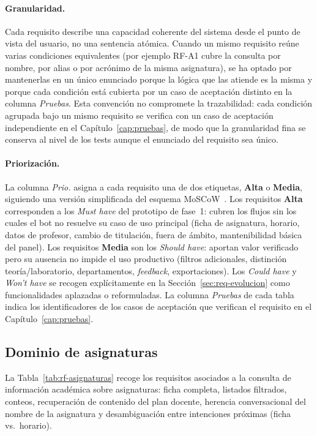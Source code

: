 \paragraph{Granularidad.} Cada requisito describe una capacidad coherente del sistema desde el punto de vista del usuario, no una sentencia atómica. Cuando un mismo requisito reúne varias condiciones equivalentes (por ejemplo RF-A1 cubre la consulta por nombre, por alias o por acrónimo de la misma asignatura), se ha optado por mantenerlas en un único enunciado porque la lógica que las atiende es la misma y porque cada condición está cubierta por un caso de aceptación distinto en la columna \textit{Pruebas}. Esta convención no compromete la trazabilidad: cada condición agrupada bajo un mismo requisito se verifica con un caso de aceptación independiente en el Capítulo~\ref{cap:pruebas}, de modo que la granularidad fina se conserva al nivel de los tests aunque el enunciado del requisito sea único.

\paragraph{Priorización.} La columna \textit{Prio.} asigna a cada requisito una de dos etiquetas, \textbf{Alta} o \textbf{Media}, siguiendo una versión simplificada del esquema MoSCoW~\cite{clegg1994case}. Los requisitos \textbf{Alta} corresponden a los \emph{Must have} del prototipo de fase~1: cubren los flujos sin los cuales el bot no resuelve su caso de uso principal (ficha de asignatura, horario, datos de profesor, cambio de titulación, fuera de ámbito, mantenibilidad básica del panel). Los requisitos \textbf{Media} son los \emph{Should have}: aportan valor verificado pero su ausencia no impide el uso productivo (filtros adicionales, distinción teoría/laboratorio, departamentos, \textit{feedback}, exportaciones). Los \emph{Could have} y \emph{Won't have} se recogen explícitamente en la Sección~\ref{sec:req-evolucion} como funcionalidades aplazadas o reformuladas. La columna \textit{Pruebas} de cada tabla indica los identificadores de los casos de aceptación que verifican el requisito en el Capítulo~\ref{cap:pruebas}.

\subsection{Dominio de asignaturas}\label{subsec:rf-asignaturas}

La Tabla~\ref{tab:rf-asignaturas} recoge los requisitos asociados a la consulta de información académica sobre asignaturas: ficha completa, listados filtrados, conteos, recuperación de contenido del plan docente, herencia conversacional del nombre de la asignatura y desambiguación entre intenciones próximas (ficha vs.\ horario).

